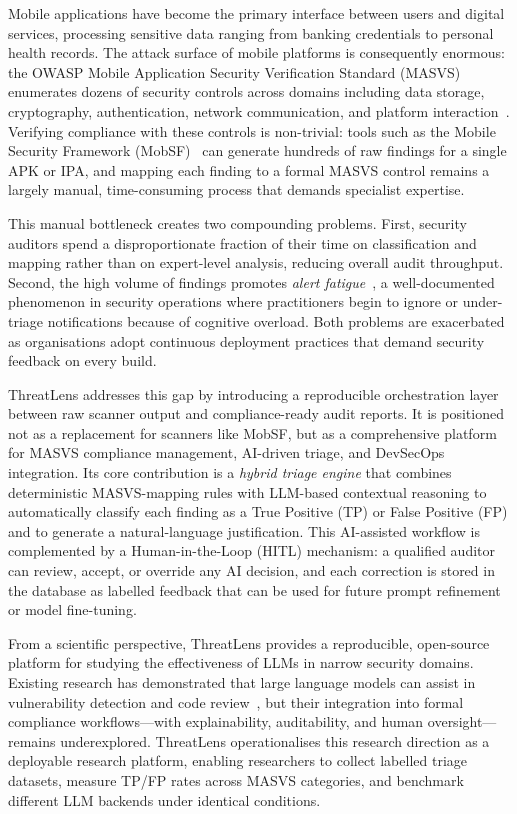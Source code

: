 \documentclass[preprint,12pt,a4paper]{elsarticle}
\begin{document}
Mobile applications have become the primary interface between users and digital services,
processing sensitive data ranging from banking credentials to personal health records.
The attack surface of mobile platforms is consequently enormous: the OWASP Mobile
Application Security Verification Standard (MASVS) enumerates dozens of security
controls across domains including data storage, cryptography, authentication, network
communication, and platform interaction~\cite{owasp_masvs}. Verifying compliance with
these controls is non-trivial: tools such as the Mobile Security Framework
(MobSF)~\cite{mobsf} can generate hundreds of raw findings for a single APK or IPA,
and mapping each finding to a formal MASVS control remains a largely manual,
time-consuming process that demands specialist expertise.

This manual bottleneck creates two compounding problems. First, security auditors spend
a disproportionate fraction of their time on classification and mapping rather than on
expert-level analysis, reducing overall audit throughput. Second, the high volume of
findings promotes \emph{alert fatigue}~\cite{alert_fatigue}, a well-documented phenomenon
in security operations where practitioners begin to ignore or under-triage notifications
because of cognitive overload. Both problems are exacerbated as organisations adopt
continuous deployment practices that demand security feedback on every build.

ThreatLens addresses this gap by introducing a reproducible orchestration layer between raw scanner
output and compliance-ready audit reports. It is positioned not as a replacement for scanners
like MobSF, but as a comprehensive platform for MASVS compliance management, AI-driven triage,
and DevSecOps integration. Its core contribution is a \emph{hybrid triage engine} that combines
deterministic MASVS-mapping rules with LLM-based contextual reasoning to automatically
classify each finding as a True Positive (TP) or False Positive (FP) and to generate a
natural-language justification. This AI-assisted workflow is complemented by a
Human-in-the-Loop (HITL) mechanism: a qualified auditor can review, accept, or override any AI
decision, and each correction is stored in the database as labelled feedback that can be used
for future prompt refinement or model fine-tuning.

From a scientific perspective, ThreatLens provides a reproducible, open-source platform
for studying the effectiveness of LLMs in narrow security domains. Existing research has
demonstrated that large language models can assist in vulnerability detection and code
review~\cite{llm_vuln}, but their integration into formal compliance workflows---with
explainability, auditability, and human oversight---remains underexplored. ThreatLens
operationalises this research direction as a deployable research platform, enabling researchers to
collect labelled triage datasets, measure TP/FP rates across MASVS categories, and
benchmark different LLM backends under identical conditions.
\end{document}
